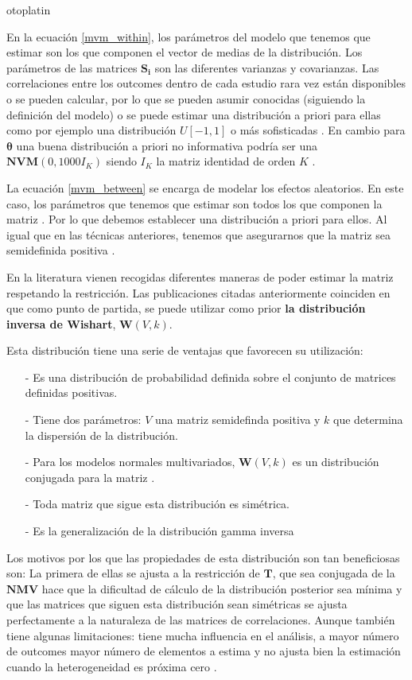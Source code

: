 otoplatin\documentclass[a4paper,openright,12pt]{report}
\begin{document}
En la ecuación \ref{mvm_within}, los parámetros del modelo que tenemos que estimar son los que componen el vector de medias de la distribución. Los parámetros de las matrices $\mathbf{S_{i}}$ son las diferentes varianzas y covarianzas. Las correlaciones entre los outcomes dentro de cada estudio rara vez están disponibles o se pueden calcular, por lo que se pueden asumir conocidas (siguiendo la definición del modelo) o se puede estimar una distribución a priori para ellas como por ejemplo una distribución $U\left[-1,1\right]$ o más sofisticadas \cite{Bujkiewicz2013}. En cambio para $\mathbf{\theta}$ una buena distribución a priori no informativa podría ser una $\mathbf{NVM}(0,1000I_{K})$ siendo $I_{K}$ la matriz identidad de orden $K$ \cite{Wei2013_2}.

La ecuación \ref{mvm_between} se encarga de modelar los efectos aleatorios. En este caso, los parámetros que tenemos que estimar son todos los que componen la matriz . Por lo que debemos establecer una distribución a priori para ellos. Al igual que en las técnicas anteriores, tenemos que asegurarnos que la matriz  sea semidefinida positiva \cite{Nam2003}\cite{Jackson2011}\cite{Wei2013}\cite{Mavridis2011}.

En la literatura vienen recogidas diferentes maneras de poder estimar la matriz respetando la restricción. Las publicaciones citadas anteriormente coinciden en que como punto de partida, se puede utilizar como prior \textbf{la distribución inversa de Wishart}, $\mathbf{W}(V,k)$. 

Esta distribución tiene una serie de ventajas que favorecen su utilización:
\begin{itemize}
\item[-] Es una distribución de probabilidad definida sobre el conjunto de matrices definidas positivas.
\item[-] Tiene dos parámetros: $V$ una matriz semidefinda positiva y $k$ que determina la dispersión de la distribución.
\item[-] Para los modelos normales multivariados, $\mathbf{W}(V,k)$ es un distribución conjugada para la matriz .
\item[-] Toda matriz que sigue esta distribución es simétrica.
\item[-] Es la generalización de la distribución gamma inversa
\end{itemize}

Los motivos por los que las propiedades de esta distribución son tan beneficiosas son: La primera de ellas se ajusta a la restricción de $\mathbf{T}$, que sea conjugada de la $\mathbf{NMV}$ hace que la dificultad de cálculo de la distribución posterior sea mínima \cite{Wei2013}y que las matrices que siguen esta distribución sean simétricas se ajusta perfectamente a la naturaleza de las matrices de correlaciones. Aunque también tiene algunas limitaciones: tiene mucha influencia en el análisis, a mayor número de outcomes mayor número de elementos a estima y no ajusta bien la estimación cuando la heterogeneidad es próxima cero \cite{Wei2013}\cite{Mavridis2011}.
\end{document}
